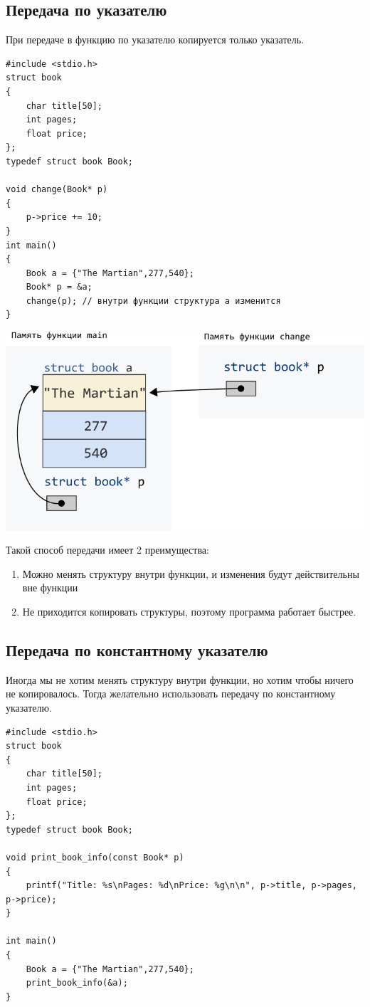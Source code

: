 \documentclass[10pt]{article}
\begin{document}
\subsection*{Передача по указателю}
При передаче в функцию по указателю копируется только указатель.
\begin{multicols}{2}
\begin{lstlisting}
#include <stdio.h>
struct book 
{
    char title[50];
    int pages;
    float price;
};
typedef struct book Book;

void change(Book* p) 
{
    p->price += 10;
}
int main() 
{
    Book a = {"The Martian",277,540};
    Book* p = &a;
    change(p); // внутри функции структура a изменится
}
\end{lstlisting}
\vfill\null
\columnbreak
\begin{center}
\includegraphics[scale=0.5]{../images/structpassbypointer.png}
\end{center}
\end{multicols}

Такой способ передачи имеет 2 преимущества:
\begin{enumerate}
\item Можно менять структуру внутри функции, и изменения будут действительны вне функции
\item Не приходится копировать структуры, поэтому программа работает быстрее.
\end{enumerate}

\subsection*{Передача по константному указателю}
Иногда мы не хотим менять структуру внутри функции, но хотим чтобы ничего не копировалось. Тогда желательно использовать передачу по константному указателю.
\begin{lstlisting}
#include <stdio.h>
struct book 
{
    char title[50];
    int pages;
    float price;
};
typedef struct book Book;

void print_book_info(const Book* p) 
{
    printf("Title: %s\nPages: %d\nPrice: %g\n\n", p->title, p->pages, p->price);
}

int main() 
{
    Book a = {"The Martian",277,540};
    print_book_info(&a);
}
\end{lstlisting}
\newpage
\end{document}
